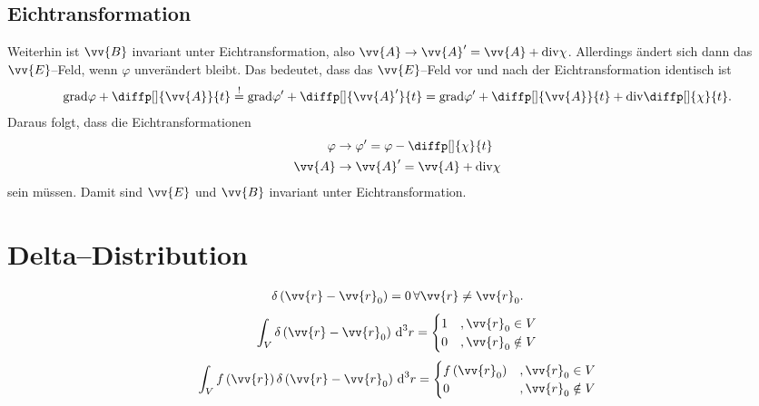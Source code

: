 \documentclass[a4paper,12pt]{article}
\newcommand{\td}{\,\text{d}}
\numberwithin{equation}{section}
\begin{document}
\subsection{Eichtransformation}
Weiterhin ist $\vv{B}$ invariant unter Eichtransformation, also $\vv{A}\rightarrow \vv{A}'=\vv{A}+\text{div}\chi$.
Allerdings ändert sich dann das $\vv{E}$--Feld, wenn $\varphi $ unverändert bleibt.
Das bedeutet, dass das $\vv{E}$--Feld vor und nach der Eichtransformation identisch ist
\begin{align} 
        \text{grad}\varphi +\diffp[]{\vv{A}}{t}\stackrel{!}{=}\text{grad}\varphi '+\diffp[]{\vv{A}'}{t}=\text{grad}\varphi '+\diffp[]{\vv{A}}{t}+\text{div}\diffp[]{\chi }{t}
.\end{align} 
Daraus folgt, dass die Eichtransformationen 
\begin{align} 
        \varphi &\rightarrow \varphi '=\varphi -\diffp[]{\chi}{t}\\
        \vv{A}&\rightarrow \vv{A}'=\vv{A}+\text{div}\chi
\end{align} 
sein müssen.
Damit sind $\vv{E}$ und $\vv{B}$ invariant unter Eichtransformation.

\newpage
\section{Delta--Distribution}
\begin{align} 
        \delta \left(\vv{r}-\vv{r}_0\right)=0\,\forall \vv{r}\neq \vv{r}_0
.\end{align} 
\begin{align} 
        \int_{V}^{}\delta \left(\vv{r}-\vv{r}_0\right)\td ^3r=\begin{cases}
                1&,\vv{r}_0 \in V\\
                0&,\vv{r}_0 \notin V
        \end{cases}
\end{align} 
\begin{align} 
        \int_{V}^{}f\left(\vv{r}\right)\delta \left(\vv{r}-\vv{r}_0\right)\td ^3r=\begin{cases}
                f\left(\vv{r}_0\right)&,\vv{r}_0 \in V\\
                0&,\vv{r}_0 \notin V
        \end{cases}
\end{align} 


\newpage
\end{document}

